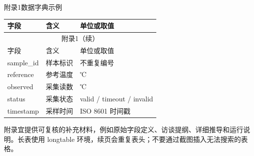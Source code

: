 \par\medskip\noindent 附录1\quad 数据字典示例\par
\begin{longtable}{lll}
\toprule 字段 & 含义 & 单位或取值\\\midrule\endfirsthead
\multicolumn{3}{c}{附录1（续）}\\\toprule 字段 & 含义 & 单位或取值\\\midrule\endhead
sample\_id & 样本标识 & 不重复编号\\
reference & 参考温度 & ℃\\
observed & 采集读数 & ℃\\
status & 采集状态 & valid / timeout / invalid\\
timestamp & 采样时间 & ISO 8601 时间戳\\\bottomrule
\end{longtable}
附录宜提供可复核的补充材料，例如原始字段定义、访谈提纲、详细推导和运行说明。长表使用 longtable 环境，续页会重复表头；不要通过截图插入无法搜索的表格。
